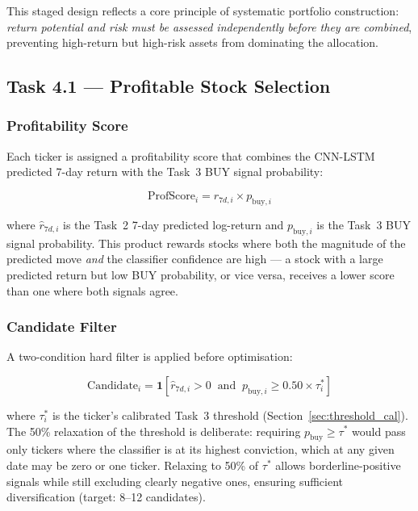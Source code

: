 \documentclass[12pt, a4paper]{article}
\begin{document}
This staged design reflects a core principle of systematic portfolio
construction: \emph{return potential and risk must be assessed
independently before they are combined}, preventing high-return but
high-risk assets from dominating the allocation.

\subsection{Task 4.1 --- Profitable Stock Selection}

\subsubsection{Profitability Score}

Each ticker is assigned a profitability score that combines the
CNN-LSTM predicted 7-day return with the Task~3 BUY signal probability:

\begin{equation}
\text{ProfScore}_i = \hat{r}_{7d,i} \times p_{\text{buy},i}
\label{eq:prof_score}
\end{equation}

where $\hat{r}_{7d,i}$ is the Task~2 7-day predicted log-return and
$p_{\text{buy},i}$ is the Task~3 BUY signal probability. This product
rewards stocks where both the magnitude of the predicted move
\emph{and} the classifier confidence are high --- a stock with a large
predicted return but low BUY probability, or vice versa, receives a
lower score than one where both signals agree.

\subsubsection{Candidate Filter}

A two-condition hard filter is applied before optimisation:

\begin{equation}
\text{Candidate}_i = \mathbf{1}\!\left[
  \hat{r}_{7d,i} > 0
  \;\;\text{and}\;\;
  p_{\text{buy},i} \geq 0.50 \times \tau_i^*
\right]
\label{eq:candidate}
\end{equation}

where $\tau_i^*$ is the ticker's calibrated Task~3 threshold
(Section~\ref{sec:threshold_cal}). The 50\% relaxation of the threshold
is deliberate: requiring $p_{\text{buy}} \geq \tau^*$ would pass
only tickers where the classifier is at its highest conviction,
which at any given date may be zero or one ticker.
Relaxing to 50\% of $\tau^*$ allows borderline-positive signals
while still excluding clearly negative ones, ensuring sufficient
diversification (target: 8--12 candidates).
\end{document}
